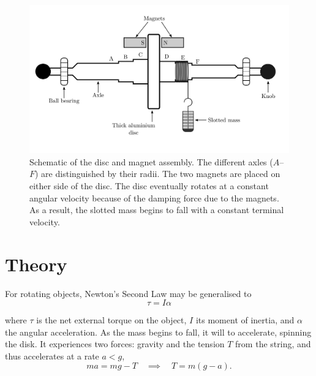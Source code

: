 \begin{figure}[!htb]
    \centering
    \includegraphics[width=\textwidth]{figs/em-damping/emdamping-setup.png}
    \caption{Schematic of the disc and magnet assembly. The different axles ($A$--$F$) are distinguished by their radii. The two magnets are placed on either side of the disc. The disc eventually rotates at a constant angular velocity because of the damping force due to the magnets. As a result, the slotted mass begins to fall with a constant terminal velocity.}
    \label{fig:emdamping-setup}
\end{figure}


\section*{Theory}

For rotating objects, Newton's Second Law may be generalised to 
\begin{equation}
    \tau = I \alpha
\end{equation}

where $\tau$ is the net external torque on the object, $I$ its moment of inertia, and $\alpha$ the angular acceleration. As the mass begins to fall, it will to accelerate, spinning the disk. It experiences two forces: gravity and the tension $T$ from the string, and thus accelerates at a rate $a<g$,
\begin{equation}
    ma = mg - T \quad \implies \quad T = m (g-a).
    \label{eqn:tension}
\end{equation}

